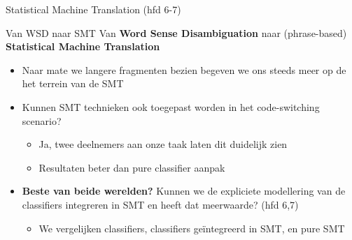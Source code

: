\documentclass[8pt]{beamer}
\begin{document}
\begin{frame}{Statistical Machine Translation (hfd 6-7)}

    \begin{block}{Van WSD naar SMT}
        Van \textbf{Word Sense Disambiguation} naar (phrase-based) \textbf{Statistical Machine Translation}
        \begin{itemize}
            \item Naar mate we langere fragmenten bezien begeven we ons steeds meer op de het terrein van de SMT
            \item Kunnen SMT technieken ook toegepast worden in het code-switching scenario?
            \begin{itemize}
                \item<2-> Ja, twee deelnemers aan onze taak laten dit duidelijk zien
                \item<2-> Resultaten beter dan pure classifier aanpak
            \end{itemize}
            \item \textbf{Beste van beide werelden?} Kunnen we de expliciete modellering van de classifiers integreren in SMT en heeft dat meerwaarde? (hfd 6,7)
           \begin{itemize}
               \item<2-> We vergelijken classifiers, classifiers geïntegreerd in SMT, en pure SMT
           \end{itemize}

        \end{itemize}
    \end{block}
\end{frame}
\end{document}
